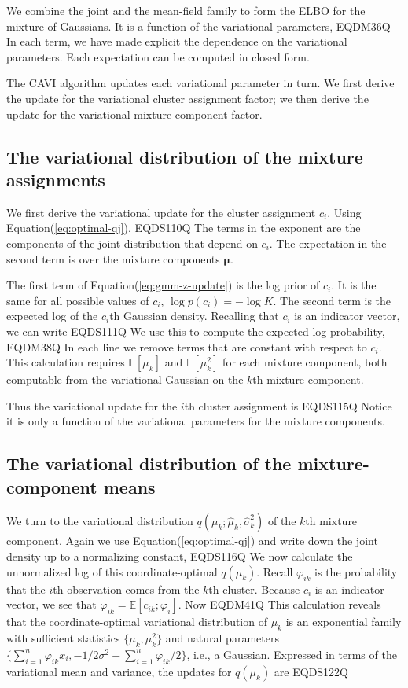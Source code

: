 \documentclass{article}
\DeclareRobustCommand{\mb}[1]{\ensuremath{\boldsymbol{\mathbf{#1}}}}
\begin{document}
We combine the joint and the mean-field family to form the \gls{ELBO}
for the mixture of Gaussians.  It is a function of the variational
parameters,
EQDM36Q
In each term, we have made explicit the dependence on the variational
parameters.  Each expectation can be computed in closed form.

The \gls{CAVI} algorithm updates each variational parameter in turn.
We first derive the update for the variational cluster assignment
factor; we then derive the update for the variational mixture
component factor.

\subsection{The variational distribution of the mixture assignments}
We first derive the variational update for the cluster assignment
$c_i$.  Using Equation\nobreakspace \textup {(\ref {eq:optimal-qj})},
EQDS110Q
The terms in the exponent are the components of the joint distribution
that depend on $c_i$.  The expectation in the second term is over the
mixture components ${\mb{\mu}}$.

The first term of Equation\nobreakspace \textup {(\ref {eq:gmm-z-update})} is the log prior of $c_i$. It
is the same for all possible values of $c_i$,
$\log p(c_i) = - \log K$. The second term is the expected log of the
$c_i$th Gaussian density. Recalling that $c_i$ is an indicator vector,
we can write
 EQDS111Q  We
use this to compute the expected log probability,
EQDM38Q
In each line we remove terms that are constant with respect to $c_i$.
This calculation requires ${\mathbb{E}\left[{\mu_k}\right]}$ and ${\mathbb{E}\left[{\mu_k^2}\right]}$ for each
mixture component, both computable from the variational Gaussian on
the $k$th mixture component.

Thus the variational update for the $i$th cluster assignment is
EQDS115Q
Notice it is only a function of the variational parameters for the
mixture components.

\subsection{The variational distribution of the mixture-component means}
\label{sec:vardist-mixcomp-means}

We turn to the variational distribution
$q(\mu_k; \hat{\mu}_k, \hat{\sigma}_k^2)$ of the $k$th mixture
component. Again we use Equation\nobreakspace \textup {(\ref {eq:optimal-qj})} and write down the joint
density up to a normalizing constant,
EQDS116Q
We now calculate the unnormalized log of this coordinate-optimal
$q(\mu_k)$. Recall $\varphi_{ik}$ is the probability that the $i$th
observation comes from the $k$th cluster. Because $c_i$ is an
indicator vector, we see that $\varphi_{ik} =
{\mathbb{E}\left[{c_{ik}; \varphi_i}\right]}$. Now
EQDM41Q
This calculation reveals that the coordinate-optimal variational
distribution of $\mu_k$ is an exponential family with sufficient
statistics $\{ \mu_k, \mu_k^2 \}$ and natural parameters
$\{ \sum_{i=1}^{n} \varphi_{ik} x_i, -1/2 \sigma^2 - \textstyle
\sum_{i=1}^{n} \varphi_{ik} / 2 \}$,
i.e., a Gaussian.  Expressed in terms of the variational mean and
variance, the updates for $q(\mu_k)$ are
EQDS122Q
\end{document}

